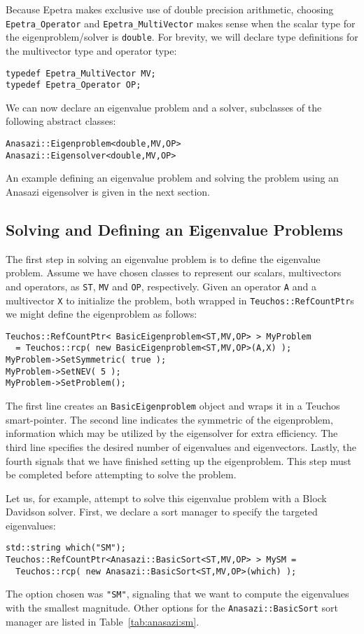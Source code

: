 Because Epetra makes exclusive use of double precision arithmetic,
choosing \verb!Epetra_Operator!  and \verb!Epetra_MultiVector!  makes
sense when the scalar type for the eigenproblem/solver is
\verb!double!. For brevity, we will declare type definitions for the
multivector type and operator type:
\begin{verbatim}
typedef Epetra_MultiVector MV;
typedef Epetra_Operator OP;
\end{verbatim}

We can now declare an eigenvalue problem and a solver, subclasses of
the following abstract classes:
\begin{verbatim}
Anasazi::Eigenproblem<double,MV,OP>
Anasazi::Eigensolver<double,MV,OP>
\end{verbatim}

An example defining an eigenvalue problem and solving the problem
using an Anasazi eigensolver is given in the next section.

\subsection{Solving and Defining an Eigenvalue Problems}
\label{sec:anasazi:example}

The first step in solving an eigenvalue problem is to define the
eigenvalue problem. Assume we have chosen classes to represent our
scalars, multivectors and operators, as \verb!ST!, \verb!MV! and
\verb!OP!, respectively. Given an operator \verb!A! and a multivector
\verb!X! to initialize the problem, both wrapped in
\verb!Teuchos::RefCountPtr!s we might define the eigenproblem as
follows:
\begin{verbatim}
Teuchos::RefCountPtr< BasicEigenproblem<ST,MV,OP> > MyProblem 
  = Teuchos::rcp( new BasicEigenproblem<ST,MV,OP>(A,X) );
MyProblem->SetSymmetric( true );
MyProblem->SetNEV( 5 );
MyProblem->SetProblem();
\end{verbatim}

The first line creates an \verb!BasicEigenproblem! object and wraps it
in a Teuchos smart-pointer. The second line indicates the symmetric of
the eigenproblem, information which may be utilized by the eigensolver
for extra efficiency. The third line specifies the desired number of
eigenvalues and eigenvectors. Lastly, the fourth signals that we have
finished setting up the eigenproblem. This step must be completed
before attempting to solve the problem.

Let us, for example, attempt to solve this eigenvalue problem with a
Block Davidson solver. First, we declare a sort manager to specify the
targeted eigenvalues:
\begin{verbatim}
std::string which("SM");
Teuchos::RefCountPtr<Anasazi::BasicSort<ST,MV,OP> > MySM =
  Teuchos::rcp( new Anasazi::BasicSort<ST,MV,OP>(which) );
\end{verbatim}
The option chosen was \verb!"SM"!, signaling that we want to compute
the eigenvalues with the smallest magnitude. Other options for the
\verb!Anasazi::BasicSort! sort manager are listed in
Table~\ref{tab:anasazi:sm}.

